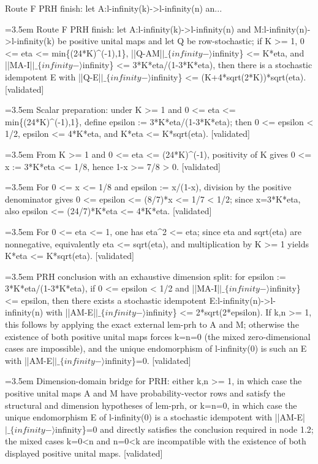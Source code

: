 \documentclass{article}
\newcommand{\step}[1]{\par\noindent\hangindent=3.5em\hangafter=1%
  \makebox[3.5em][l]{\textbf{#1.}}}
\newcommand{\steptag}[1]{\hfill{\small\textsf{[#1]}}}
\begin{document}
\begin{proofbox}{Route F PRH finish: let A:l-infinity(k)->l-infinity(n) an...}
\step{1} Route F PRH finish: let A:l-infinity(k)->l-infinity(n) and M:l-infinity(n)->l-infinity(k) be positive unital maps and let Q be row-stochastic; if K >= 1, 0 <= eta <= min\{(24*K)\textasciicircum{}(-1),1\}, ||Q-AM|$|\_\{infinity-\rangle$infinity\} <= K*eta, and ||MA-I|$|\_\{infinity-\rangle$infinity\} <= 3*K*eta/(1-3*K*eta), then there is a stochastic idempotent E with ||Q-E|$|\_\{infinity-\rangle$infinity\} <= (K+4*sqrt(2*K))*sqrt(eta). \steptag{validated} \\[6pt]
\step{1.1} Scalar preparation: under K >= 1 and 0 <= eta <= min\{(24*K)\textasciicircum{}(-1),1\}, define epsilon := 3*K*eta/(1-3*K*eta); then 0 <= epsilon < 1/2, epsilon <= 4*K*eta, and K*eta <= K*sqrt(eta). \steptag{validated} \\[6pt]
\step{1.1.1} From K >= 1 and 0 <= eta <= (24*K)\textasciicircum{}(-1), positivity of K gives 0 <= x := 3*K*eta <= 1/8, hence 1-x >= 7/8 > 0. \steptag{validated} \\[4pt]
\step{1.1.2} For 0 <= x <= 1/8 and epsilon := x/(1-x), division by the positive denominator gives 0 <= epsilon <= (8/7)*x <= 1/7 < 1/2; since x=3*K*eta, also epsilon <= (24/7)*K*eta <= 4*K*eta. \steptag{validated} \\[4pt]
\step{1.1.3} For 0 <= eta <= 1, one has eta\textasciicircum{}2 <= eta; since eta and sqrt(eta) are nonnegative, equivalently eta <= sqrt(eta), and multiplication by K >= 1 yields K*eta <= K*sqrt(eta). \steptag{validated} \\[4pt]
\step{1.2} PRH conclusion with an exhaustive dimension split: for epsilon := 3*K*eta/(1-3*K*eta), if 0 <= epsilon < 1/2 and ||MA-I|$|\_\{infinity-\rangle$infinity\} <= epsilon, then there exists a stochastic idempotent E:l-infinity(n)->l-infinity(n) with ||AM-E|$|\_\{infinity-\rangle$infinity\} <= 2*sqrt(2*epsilon). If k,n >= 1, this follows by applying the exact external lem-prh to A and M; otherwise the existence of both positive unital maps forces k=n=0 (the mixed zero-dimensional cases are impossible), and the unique endomorphism of l-infinity(0) is such an E with ||AM-E|$|\_\{infinity-\rangle$infinity\}=0. \steptag{validated} \\[6pt]
\step{1.2.1} Dimension-domain bridge for PRH: either k,n >= 1, in which case the positive unital maps A and M have probability-vector rows and satisfy the structural and dimension hypotheses of lem-prh, or k=n=0, in which case the unique endomorphism E of l-infinity(0) is a stochastic idempotent with ||AM-E|$|\_\{infinity-\rangle$infinity\}=0 and directly satisfies the conclusion required in node 1.2; the mixed cases k=0<n and n=0<k are incompatible with the existence of both displayed positive unital maps. \steptag{validated} \\[6pt]

\end{proofbox}
\end{document}
